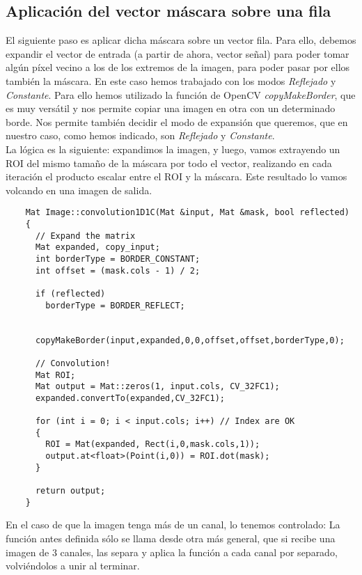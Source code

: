 \documentclass[a4paper, 11pt]{article}
\theoremstyle{definition}
\begin{document}
  \subsection{Aplicación del vector máscara sobre una fila}

  El siguiente paso es aplicar dicha máscara sobre un vector fila. Para ello, debemos
  expandir el vector de entrada (a partir de ahora, vector señal) para poder tomar
  algún píxel vecino a los de los extremos de la imagen, para poder pasar por ellos también
  la máscara. En este caso hemos trabajado con los modos \textit{Reflejado} y \textit{Constante}.
  Para ello hemos utilizado la función de OpenCV \textit{copyMakeBorder}, que es
  muy versátil y nos permite copiar una imagen en otra con un determinado borde.
  Nos permite también decidir el modo de expansión que queremos, que en nuestro caso,
  como hemos indicado, son \textit{Reflejado} y \textit{Constante}.\\

  La lógica es la siguiente: expandimos la imagen, y luego, vamos extrayendo
  un ROI del mismo tamaño de la máscara por todo el vector, realizando en cada
  iteración el producto escalar entre el ROI y la máscara. Este resultado lo vamos
  volcando en una imagen de salida.

  \begin{lstlisting}
    Mat Image::convolution1D1C(Mat &input, Mat &mask, bool reflected)
    {
      // Expand the matrix
      Mat expanded, copy_input;
      int borderType = BORDER_CONSTANT;
      int offset = (mask.cols - 1) / 2;

      if (reflected)
        borderType = BORDER_REFLECT;


      copyMakeBorder(input,expanded,0,0,offset,offset,borderType,0);

      // Convolution!
      Mat ROI;
      Mat output = Mat::zeros(1, input.cols, CV_32FC1);
      expanded.convertTo(expanded,CV_32FC1);

      for (int i = 0; i < input.cols; i++) // Index are OK
      {
        ROI = Mat(expanded, Rect(i,0,mask.cols,1));
        output.at<float>(Point(i,0)) = ROI.dot(mask);
      }

      return output;
    }
  \end{lstlisting}

  En el caso de que la imagen tenga más de un canal, lo tenemos controlado: La función
  antes definida sólo se llama desde otra más general, que si recibe una imagen de
  3 canales, las separa y aplica la función a cada canal por separado, volviéndolos
  a unir al terminar.
\end{document}
